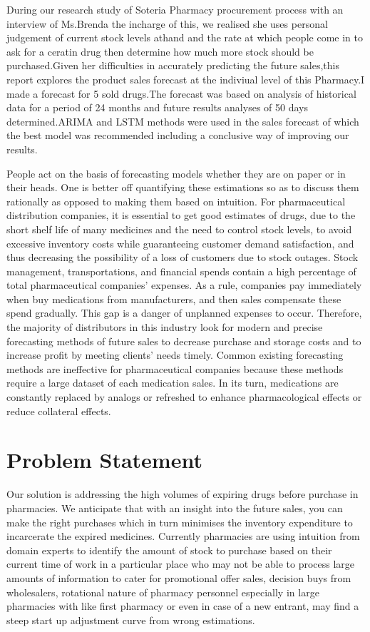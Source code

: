 \documentclass[12pt]{report}
\begin{document}
During our research study of Soteria Pharmacy procurement process with an interview of Ms.Brenda the incharge of this, we realised she uses personal judgement of current stock levels athand and the rate at which people come in to ask for a ceratin drug then determine how much more stock should be purchased.Given her difficulties in accurately predicting the future sales,this report explores the product sales forecast at the indiviual level of this Pharmacy.I made a forecast for 5 sold drugs.The forecast was based on analysis of  historical data for a period of 24 months and future results analyses of 50 days determined.ARIMA and LSTM methods were used in the sales forecast of which the best model was recommended including a conclusive way of improving our results.


People act on the basis of forecasting models whether they are on paper or in their heads. One is better off quantifying these estimations so as to discuss them rationally as opposed to making them based on intuition. For pharmaceutical distribution companies, it is essential to get good estimates of drugs, due to the short shelf life of many medicines and the need to control stock levels, to avoid excessive inventory costs while guaranteeing customer demand satisfaction, and thus decreasing the possibility of a loss of customers due to stock outages.
Stock management, transportations, and financial spends contain a high percentage of total pharmaceutical companies’ expenses. As a rule, companies pay immediately when buy medications from manufacturers, and then sales compensate these spend gradually. This gap is a danger of unplanned expenses to occur. Therefore, the majority of distributors in this industry look for modern and precise forecasting methods of future sales to decrease purchase and storage costs and to increase profit by meeting clients’ needs timely.
Common existing forecasting methods are ineffective for pharmaceutical companies because these methods require a large dataset of each medication sales. In its turn, medications are constantly replaced by analogs or refreshed to enhance pharmacological effects or reduce collateral effects.
\\




\section{Problem Statement}
Our solution is addressing the high volumes of expiring drugs before purchase in pharmacies.
We anticipate that with an insight into the future sales, you can make the right purchases which
in turn minimises the inventory expenditure to incarcerate the expired medicines. Currently
pharmacies are using intuition from domain experts to identify the amount of stock to purchase
based on their current time of work in a particular place who may not be able to process large
amounts of information to cater for promotional offer sales, decision buys from wholesalers,
rotational nature of pharmacy personnel especially in large pharmacies with like first pharmacy
or even in case of a new entrant, may find a steep start up adjustment curve from wrong
estimations.
\end{document}
